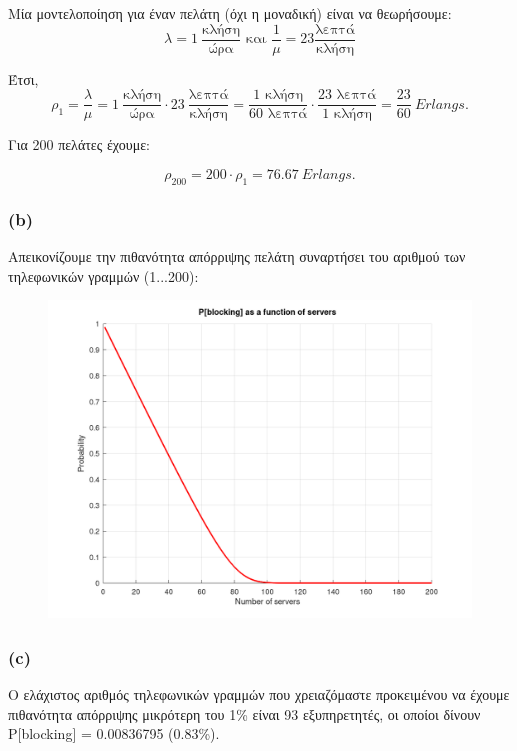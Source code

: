 \documentclass[a4paper]{article}
\begin{document}
Μία μοντελοποίηση για έναν πελάτη (όχι η μοναδική) είναι να θεωρήσουμε: 
\[
	λ = 1 \ \frac{\text{κλήση}}{\text{ώρα}} \text{ και } \frac{1}{μ} = 23 \frac{\text{λεπτά}}{\text{κλήση}}
\]

Έτσι, 
\[
	ρ_1 = \frac{λ}{μ} = 1 \ \frac{\text{κλήση}}{\text{ώρα}} \cdot 23 \ \frac{\text{λεπτά}}{\text{κλήση}} = \frac{\text{1 κλήση}}{\text{60 λεπτά}} \cdot \frac{\text{23 λεπτά}}{\text{1 κλήση}} = \frac{23}{60} \ Erlangs.
\]
 
Για 200 πελάτες έχουμε:

\[
	 ρ_{200} = 200 \cdot ρ_1 = 76.67 \ Erlangs.
\]

\subsubsection*{(b)}

Απεικονίζουμε την πιθανότητα απόρριψης πελάτη συναρτήσει του αριθμού των τηλεφωνικών γραμμών (1...200):

\begin{figure}[H]
	\includegraphics[width=\textwidth]{call_center.png}
\end{figure}

\subsubsection*{(c)}

Ο ελάχιστος αριθμός τηλεφωνικών γραμμών που χρειαζόμαστε προκειμένου να έχουμε πιθανότητα απόρριψης μικρότερη του 1\% είναι 93 εξυπηρετητές, οι οποίοι δίνουν P[blocking] = 0.00836795 (0.83\%).
\end{document}
